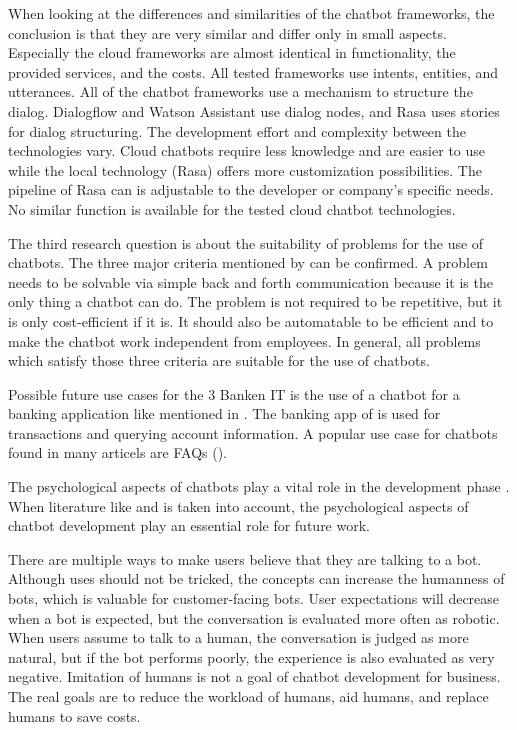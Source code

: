 When looking at the differences and similarities of the chatbot frameworks, the conclusion is that they are very similar and differ only in small aspects.
Especially the cloud frameworks are almost identical in functionality, the provided services, and the costs.
All tested frameworks use intents, entities, and utterances.
All of the chatbot frameworks use a mechanism to structure the dialog.
Dialogflow and Watson Assistant use dialog nodes, and Rasa uses stories for dialog structuring.
The development effort and complexity between the technologies vary.
Cloud chatbots require less knowledge and are easier to use while the local technology (Rasa) offers more customization possibilities.
The pipeline of Rasa can is adjustable to the developer or company's specific needs.
No similar function is available for the tested cloud chatbot technologies.

The third research question is about the suitability of problems for the use of chatbots.
The three major criteria mentioned by \citet{singhbuilding} can be confirmed.
A problem needs to be solvable via simple back and forth communication because it is the only thing a chatbot can do.
The problem is not required to be repetitive, but it is only cost-efficient if it is.
It should also be automatable to be efficient and to make the chatbot work independent from employees.
In general, all problems which satisfy those three criteria are suitable for the use of chatbots.

Possible future use cases for the 3 Banken IT is the use of a chatbot for a banking application like mentioned in \citet{singhbuilding}.
The banking app of \citet{singhbuilding} is used for transactions and querying account information.
A popular use case for chatbots found in many articels are FAQs (\citet{evaluateChatbotsShawar2007, buiildChatbotsPython, huang2007extracting, GO2019304}).

The psychological aspects of chatbots play a vital role in the development phase \cite{GO2019304}.
When literature like \citet{folstad2017chatbots, brandtzaeg2018chatbots} and \citet{GO2019304} is taken into account, the psychological aspects of chatbot development play an essential role for future work.

There are multiple ways to make users believe that they are talking to a bot.
Although uses should not be tricked, the concepts can increase the humanness of bots, which is valuable for customer-facing bots.
User expectations will decrease when a bot is expected, but the conversation is evaluated more often as robotic.
When users assume to talk to a human, the conversation is judged as more natural, but if the bot performs poorly, the experience is also evaluated as very negative.
Imitation of humans is not a goal of chatbot development for business.
The real goals are to reduce the workload of humans, aid humans, and replace humans to save costs.

